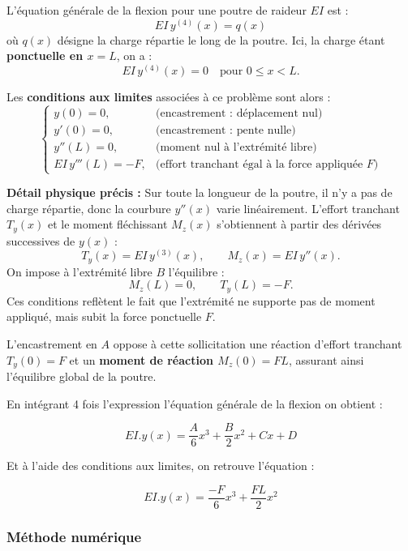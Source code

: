 \documentclass[12pt, a4paper]{article}
\begin{document}
\vspace{0.5em}

\noindent
L’équation générale de la flexion pour une poutre de raideur $EI$ est :
\[
EI\,y^{(4)}(x) = q(x)
\]
où $q(x)$ désigne la charge répartie le long de la poutre.  
Ici, la charge étant \textbf{ponctuelle en $x=L$}, on a :
\[
EI\,y^{(4)}(x) = 0 \quad \text{pour } 0 \le x < L.
\]

\vspace{0.5em}

Les \textbf{conditions aux limites} associées à ce problème sont alors :
\[
\begin{cases}
y(0) = 0, & \text{(encastrement : déplacement nul)} \\[4pt]
y'(0) = 0, & \text{(encastrement : pente nulle)} \\[4pt]
y''(L) = 0, & \text{(moment nul à l’extrémité libre)} \\[4pt]
EI\,y'''(L) = -F, & \text{(effort tranchant égal à la force appliquée $F$)} 
\end{cases}
\]

\vspace{1em}

\noindent
\textbf{Détail physique précis :}  
Sur toute la longueur de la poutre, il n’y a pas de charge répartie, donc la courbure $y''(x)$ varie linéairement.  
L’effort tranchant $T_y(x)$ et le moment fléchissant $M_z(x)$ s’obtiennent à partir des dérivées successives de $y(x)$ :
\[
T_y(x) = EI\,y^{(3)}(x), \qquad M_z(x) = EI\,y''(x).
\]
On impose à l’extrémité libre $B$ l’équilibre :
\[
M_z(L) = 0, \qquad T_y(L) = -F.
\]
Ces conditions reflètent le fait que l’extrémité ne supporte pas de moment appliqué, mais subit la force ponctuelle $F$.

\vspace{0.5em}

\noindent
L’encastrement en $A$ oppose à cette sollicitation une réaction d’effort tranchant $T_y(0)=F$ et un \textbf{moment de réaction $M_z(0)=F L$}, assurant ainsi l’équilibre global de la poutre.

En intégrant 4 fois l'expression l'équation générale de la flexion on obtient :

\[ EI.y(x) = \dfrac{A}{6}x^{3} + \dfrac{B}{2}x^{2} + Cx + D
\]

Et à l'aide des conditions aux limites, on retrouve l'équation :

\[ EI.y(x) = \dfrac{-F}{6}x^{3} + \dfrac{FL}{2}x^{2} 
\]

\subsubsection{Méthode numérique}
\end{document}
